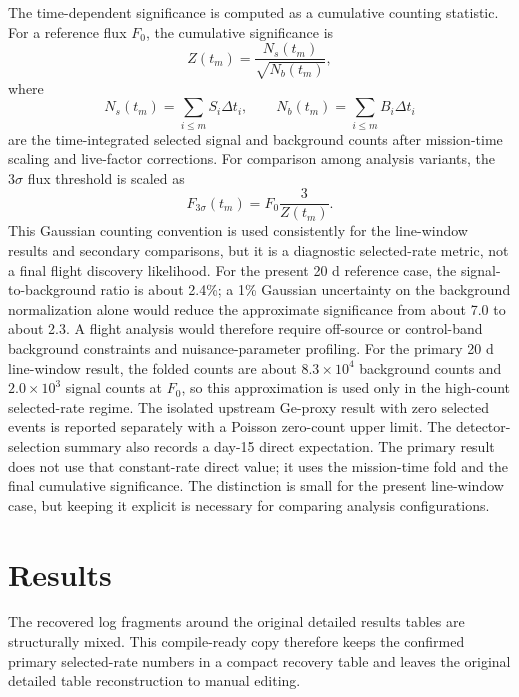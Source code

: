 \documentclass[11pt]{article}
\newcommand{\fzero}{F_{0}}
\newcommand{\fthree}{F_{3\sigma}}
\begin{document}
The time-dependent significance is computed as a cumulative counting statistic. For a reference flux $\fzero$, the cumulative significance is
\begin{equation}
  Z(t_m) = \frac{N_s(t_m)}{\sqrt{N_b(t_m)}},
\end{equation}
where
\begin{equation}
  N_s(t_m)=\sum_{i\leq m}S_i\Delta t_i,\qquad
  N_b(t_m)=\sum_{i\leq m}B_i\Delta t_i
\end{equation}
are the time-integrated selected signal and background counts after
mission-time scaling and live-factor corrections. For comparison among
analysis variants, the $3\sigma$ flux threshold is scaled as
\begin{equation}
  \fthree(t_m) = \fzero \frac{3}{Z(t_m)}.
\end{equation}
This Gaussian counting convention is used consistently for the line-window
results and secondary comparisons, but it is a diagnostic selected-rate metric,
not a final flight discovery likelihood. For the present 20 d reference case,
the signal-to-background ratio is about 2.4\%; a 1\% Gaussian uncertainty on the
background normalization alone would reduce the approximate significance from
about 7.0 to about 2.3. A flight analysis would therefore require off-source
or control-band background constraints and nuisance-parameter profiling.
For the primary 20 d line-window result, the folded counts are about
$8.3\times10^4$ background counts and $2.0\times10^3$ signal counts at
$\fzero$, so this approximation is used only in the high-count selected-rate
regime. The isolated upstream Ge-proxy result with zero selected events is
reported separately with a Poisson zero-count upper limit.
The detector-selection summary also records a day-15 direct expectation. The primary
result does not use that constant-rate direct value; it uses the
mission-time fold and the final cumulative significance. The distinction is
small for the present line-window case, but keeping it explicit is necessary
for comparing analysis configurations.


\section{Results}
\label{sec:results}

The recovered log fragments around the original detailed results tables are structurally mixed. This compile-ready copy therefore keeps the confirmed primary selected-rate numbers in a compact recovery table and leaves the original detailed table reconstruction to manual editing.
\end{document}
